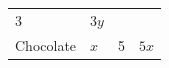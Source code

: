 {\begin{mdframed}[linewidth=4, leftmargin=40, rightmargin=40]
\begin{exercise}
\begin{enumerate}[noitemsep, label=\textbf{Step} \textbf{\arabic*}. ]
{\begin{tabular}[t]{|l|l|l|l|}
    
        3 &
    
    
        
                  \begin{math}3y\end{math}
     \tabularnewline\cline{1-1}\cline{2-2}\cline{3-3}\cline{4-4}
    
    
        Chocolate &
    
    
        
                  \begin{math}x\end{math}
                 &
    
    
        5 &
    
    
        
                  \begin{math}5x\end{math}
     \tabularnewline\cline{1-1}\cline{2-2}\cline{3-3}\cline{4-4}
    \end{tabular}} %
      \addtocounter{footnote}{-0}
      

\end{enumerate}
\end{exercise}
\end{mdframed}}
